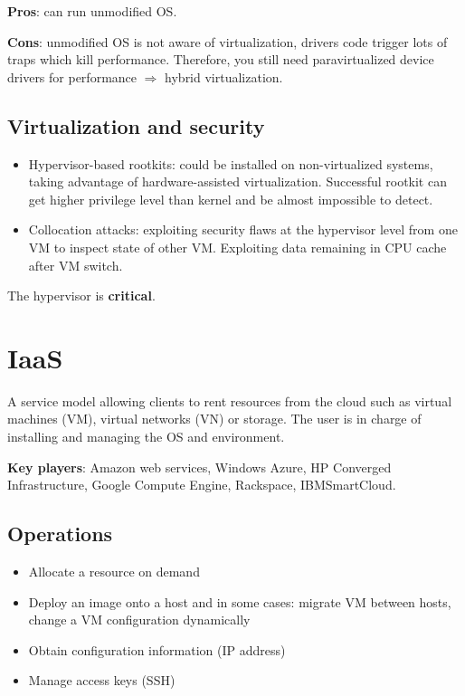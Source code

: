 \textbf{Pros}: can run unmodified OS.

\textbf{Cons}: unmodified OS is not aware of virtualization, drivers code trigger lots of traps which kill performance. Therefore, you still need paravirtualized device drivers for performance $\Rightarrow$ hybrid virtualization.

\subsection{Virtualization and security}

\begin{itemize}
    \item Hypervisor-based rootkits: could be installed on non-virtualized systems, taking advantage of hardware-assisted virtualization. Successful rootkit can get higher privilege level than kernel and be almost impossible to detect.
    \item Collocation attacks: exploiting security flaws at the hypervisor level from one VM to inspect state of other VM. Exploiting data remaining in CPU cache after VM switch.
\end{itemize}

The hypervisor is \textbf{critical}.

\section{IaaS}

A service model allowing clients to rent resources from the cloud such as virtual machines (VM), virtual networks (VN) or storage. The user is in charge of installing and managing the OS and environment.

\textbf{Key players}: Amazon web services, Windows Azure, HP Converged Infrastructure, Google Compute Engine, Rackspace, IBMSmartCloud.

\subsection{Operations}

\begin{itemize}
    \item Allocate a resource on demand
    \item Deploy an image onto a host and in some cases: migrate VM between hosts, change a VM configuration dynamically
    \item Obtain configuration information (IP address)
    \item Manage access keys (SSH)
\end{itemize}

